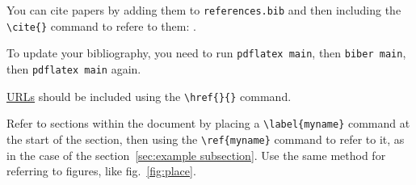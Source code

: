 \documentclass{newseye_del}
\begin{document}
You can cite papers by adding them to \texttt{references.bib}
and then including the \verb.\cite{}. command to refere to them:
\cite{Crane2017}.

To update your bibliography, you need to run \texttt{pdflatex main},
then \texttt{biber main}, then \texttt{pdflatex main} again.


\href{https://www.newseye.eu/}{URLs} should be included using the \verb.\href{}{}. command.

Refer to sections within the document by placing a \verb.\label{myname}.
command at the start of the section, then using the \verb.\ref{myname}.
command to refer to it, as in the case of the
section~\ref{sec:example subsection}. Use the same method for referring
to figures, like fig.~\ref{fig:place}.





\newpage
\printbibliography
\end{document}
